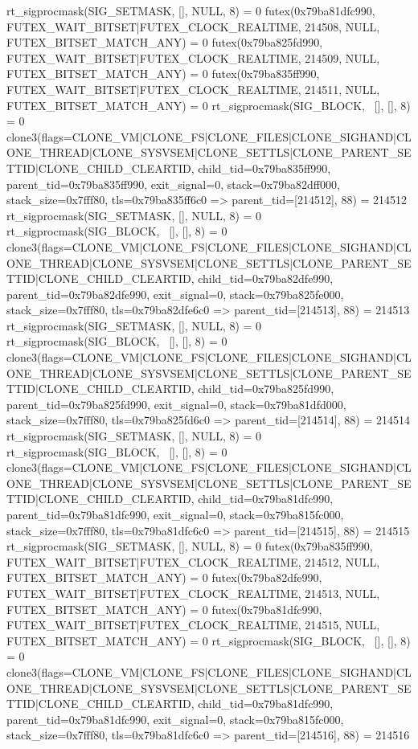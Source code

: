 \begin{breakableverbatim}
rt_sigprocmask(SIG_SETMASK, [], NULL, 8) = 0
futex(0x79ba81dfc990, FUTEX_WAIT_BITSET|FUTEX_CLOCK_REALTIME, 214508, NULL, FUTEX_BITSET_MATCH_ANY) = 0
futex(0x79ba825fd990, FUTEX_WAIT_BITSET|FUTEX_CLOCK_REALTIME, 214509, NULL, FUTEX_BITSET_MATCH_ANY) = 0
futex(0x79ba835ff990, FUTEX_WAIT_BITSET|FUTEX_CLOCK_REALTIME, 214511, NULL, FUTEX_BITSET_MATCH_ANY) = 0
rt_sigprocmask(SIG_BLOCK, ~[], [], 8)   = 0
clone3({flags=CLONE_VM|CLONE_FS|CLONE_FILES|CLONE_SIGHAND|CLONE_THREAD|CLONE_SYSVSEM|CLONE_SETTLS|CLONE_PARENT_SETTID|CLONE_CHILD_CLEARTID, child_tid=0x79ba835ff990, parent_tid=0x79ba835ff990, exit_signal=0, stack=0x79ba82dff000, stack_size=0x7fff80, tls=0x79ba835ff6c0} => {parent_tid=[214512]}, 88) = 214512
rt_sigprocmask(SIG_SETMASK, [], NULL, 8) = 0
rt_sigprocmask(SIG_BLOCK, ~[], [], 8)   = 0
clone3({flags=CLONE_VM|CLONE_FS|CLONE_FILES|CLONE_SIGHAND|CLONE_THREAD|CLONE_SYSVSEM|CLONE_SETTLS|CLONE_PARENT_SETTID|CLONE_CHILD_CLEARTID, child_tid=0x79ba82dfe990, parent_tid=0x79ba82dfe990, exit_signal=0, stack=0x79ba825fe000, stack_size=0x7fff80, tls=0x79ba82dfe6c0} => {parent_tid=[214513]}, 88) = 214513
rt_sigprocmask(SIG_SETMASK, [], NULL, 8) = 0
rt_sigprocmask(SIG_BLOCK, ~[], [], 8)   = 0
clone3({flags=CLONE_VM|CLONE_FS|CLONE_FILES|CLONE_SIGHAND|CLONE_THREAD|CLONE_SYSVSEM|CLONE_SETTLS|CLONE_PARENT_SETTID|CLONE_CHILD_CLEARTID, child_tid=0x79ba825fd990, parent_tid=0x79ba825fd990, exit_signal=0, stack=0x79ba81dfd000, stack_size=0x7fff80, tls=0x79ba825fd6c0} => {parent_tid=[214514]}, 88) = 214514
rt_sigprocmask(SIG_SETMASK, [], NULL, 8) = 0
rt_sigprocmask(SIG_BLOCK, ~[], [], 8)   = 0
clone3({flags=CLONE_VM|CLONE_FS|CLONE_FILES|CLONE_SIGHAND|CLONE_THREAD|CLONE_SYSVSEM|CLONE_SETTLS|CLONE_PARENT_SETTID|CLONE_CHILD_CLEARTID, child_tid=0x79ba81dfc990, parent_tid=0x79ba81dfc990, exit_signal=0, stack=0x79ba815fc000, stack_size=0x7fff80, tls=0x79ba81dfc6c0} => {parent_tid=[214515]}, 88) = 214515
rt_sigprocmask(SIG_SETMASK, [], NULL, 8) = 0
futex(0x79ba835ff990, FUTEX_WAIT_BITSET|FUTEX_CLOCK_REALTIME, 214512, NULL, FUTEX_BITSET_MATCH_ANY) = 0
futex(0x79ba82dfe990, FUTEX_WAIT_BITSET|FUTEX_CLOCK_REALTIME, 214513, NULL, FUTEX_BITSET_MATCH_ANY) = 0
futex(0x79ba81dfc990, FUTEX_WAIT_BITSET|FUTEX_CLOCK_REALTIME, 214515, NULL, FUTEX_BITSET_MATCH_ANY) = 0
rt_sigprocmask(SIG_BLOCK, ~[], [], 8)   = 0
clone3({flags=CLONE_VM|CLONE_FS|CLONE_FILES|CLONE_SIGHAND|CLONE_THREAD|CLONE_SYSVSEM|CLONE_SETTLS|CLONE_PARENT_SETTID|CLONE_CHILD_CLEARTID, child_tid=0x79ba81dfc990, parent_tid=0x79ba81dfc990, exit_signal=0, stack=0x79ba815fc000, stack_size=0x7fff80, tls=0x79ba81dfc6c0} => {parent_tid=[214516]}, 88) = 214516

\end{breakableverbatim}
